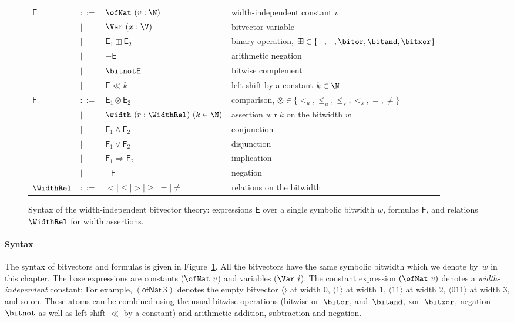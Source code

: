 \begin{figure}[tb]
\centering
{\footnotesize
\begin{tabular}{llll}
$\mathsf{E}$ & $::=$ & $\ofNat~(v : \N)$ & width-independent constant $v$ \\
    & $\mid$ & $\Var~(x : \V)$ & bitvector variable \\
    & $\mid$ & $\mathsf{E}_1 \boxplus \mathsf{E}_2$ & binary operation, $\boxplus \in \{+, -, \bitor, \bitand, \bitxor\}$ \\
    & $\mid$ & $- \mathsf{E}$ & arithmetic negation \\
    & $\mid$ & $\bitnot \mathsf{E}$ & bitwise complement \\
    & $\mid$ & $\mathsf{E} \ll k$ & left shift by a constant $k \in \N$ \\[4pt]
$\mathsf{F}$ & $::=$ & $\mathsf{E}_1 \otimes \mathsf{E}_2$ & comparison, $\otimes \in \{<_u, \leq_u, \leq_s, <_s, =, \neq \}$ \\
    & $\mid$ & $\width~(r : \WidthRel)~(k \in \N)$ & assertion $w \mathrel{r} k$ on the bitwidth $w$ \\
    & $\mid$ & $\mathsf{F}_1 \land \mathsf{F}_2$ & conjunction \\
    & $\mid$ & $\mathsf{F}_1 \lor \mathsf{F}_2$ & disjunction \\
    & $\mid$ & $\mathsf{F}_1 \Rightarrow \mathsf{F}_2$ & implication \\
    & $\mid$ & $\neg \mathsf{F}$ & negation \\[4pt]
$\WidthRel$ & $::=$ & ${<} \mid {\leq} \mid {>} \mid {\geq} \mid {=} \mid {\neq}$ & relations on the bitwidth \\
\end{tabular}
}
  \caption{Syntax of the width-independent bitvector theory: expressions
  $\mathsf{E}$ over a single symbolic bitwidth $w$, formulas $\mathsf{F}$, and
  relations $\WidthRel$ for width assertions.}
  \label{fig:swbv:syntax-formula}
\end{figure}

\paragraph{Syntax}
The syntax of bitvectors and formulas is given in
Figure~\ref{fig:swbv:syntax-formula}.
%
All the bitvectors have the same symbolic bitwidth which we denote by~$w$ in
this chapter.
%
The base expressions are constants ($\ofNat~v$) and variables ($\Var~i$).
The constant expression $(\ofNat~v)$ denotes a \emph{width-independent}
constant: For example, $(\mathsf{ofNat}~3)$ denotes the empty bitvector $\langle
\rangle$ at width 0,  $\langle1\rangle$ at width 1, $\langle 11 \rangle$ at
width 2, $\langle 011 \rangle$ at width 3, and so on. These atoms can be
combined using the usual bitwise operations (bitwise or~$\bitor$, and~$\bitand$,
xor~$\bitxor$, negation~$\bitnot$ as well as left shift $\ll$ by a constant) and
arithmetic addition, subtraction and negation.

